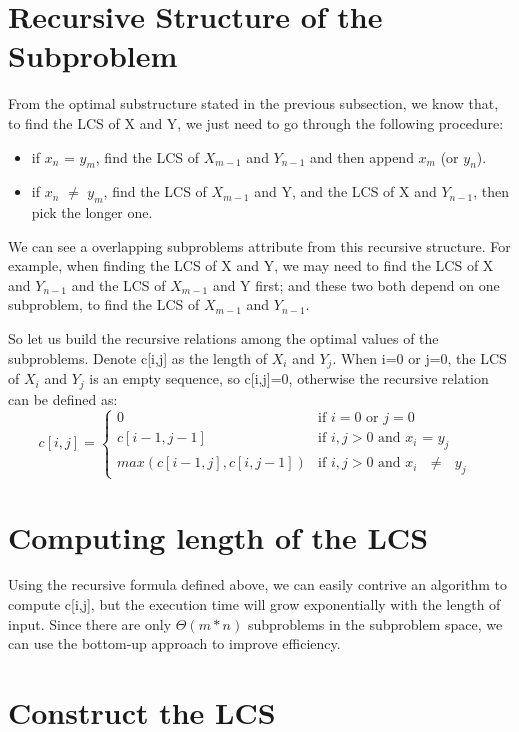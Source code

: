 \documentclass{report}
\begin{document}
    \section{Recursive Structure of the Subproblem}
    From the optimal substructure stated in the previous subsection, we know that, to find the LCS of X and Y, we just need to go through the following procedure:
    \begin{itemize}
        \item if $x_n$ = $y_m$, find the LCS of $X_{m-1}$ and $Y_{n-1}$ and then append $x_m$ (or $y_n$).
        \item if $x_n$ $\neq$ $y_m$, find the LCS of $X_{m-1}$ and Y, and the LCS of X and $Y_{n-1}$, then pick the longer one.
    \end{itemize}
    
    We can see a overlapping subproblems attribute from this recursive structure. For example, when finding the LCS of X and Y, we may need to find the LCS of X and $Y_{n-1}$ and the LCS of $X_{m-1}$ and Y first; and these two both depend on one subproblem, to find the LCS of $X_{m-1}$ and $Y_{n-1}$.
    
    So let us build the recursive relations among the optimal values of the subproblems.
    Denote c[i,j] as the length of $X_i$ and $Y_j$. When i=0 or j=0, the LCS of $X_i$ and $Y_j$ is an empty sequence, so c[i,j]=0, otherwise the recursive relation can be defined as:
        \[ c[i,j] =  \begin{cases} 
          0 &  \text{if $i=0$ or $j=0$}   \\
          c[i-1, j-1] & \text{if $i,j > 0$ and $x_i$ = $y_j$ } \\
          max(c[i-1, j], c[i, j-1]) & \text{if $i,j > 0$ and $x_i$  $\neq$ $y_j$ } 
       \end{cases} \]
    
    \section{Computing length of the LCS}
    Using the recursive formula defined above, we can easily contrive an algorithm to compute c[i,j], but the execution time will grow exponentially with the length of input. Since there are only $\Theta(m*n)$ subproblems in the subproblem space, we can use the bottom-up approach to improve efficiency.
    \section{Construct the LCS}
\end{document}
